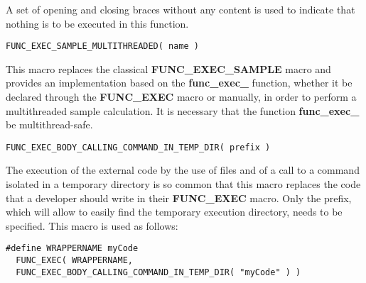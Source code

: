 A set of opening and closing braces without any content is used to indicate that nothing is to be executed in this function.

\lstset{language=C++, basicstyle=\normalsize}
\begin{lstlisting}[frame=TRBL]
  FUNC_EXEC_SAMPLE_MULTITHREADED( name )
\end{lstlisting}

This macro replaces the classical {\bf FUNC\_EXEC\_SAMPLE} macro and provides an implementation based on the {\bf func\_exec\_} function, whether it be declared through the {\bf FUNC\_EXEC} macro or manually, in order to perform a multithreaded sample calculation. It is necessary that the function {\bf func\_exec\_} be multithread-safe.

\lstset{language=C++, basicstyle=\normalsize}
\begin{lstlisting}[frame=TRBL]
  FUNC_EXEC_BODY_CALLING_COMMAND_IN_TEMP_DIR( prefix )
\end{lstlisting}

The execution of the external code by the use of files and of a call to a command isolated in a temporary directory is so common that this macro replaces the code that a developer should write in their {\bf FUNC\_EXEC} macro. Only the prefix, which will allow to easily find the temporary execution directory, needs to be specified. This macro is used as follows:

\lstset{language=C++, basicstyle=\normalsize}
\begin{lstlisting}[frame=TRBL]
  #define WRAPPERNAME myCode
  FUNC_EXEC( WRAPPERNAME,
  FUNC_EXEC_BODY_CALLING_COMMAND_IN_TEMP_DIR( "myCode" ) )
\end{lstlisting}
